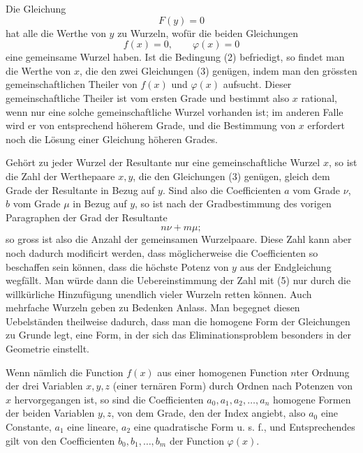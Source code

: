 \documentclass[11pt]{article}
\begin{document}
Die Gleichung
\begin{equation}
F(y)=0
\tag{2}
\end{equation}
hat alle die Werthe von $y$ zu Wurzeln, wofür die beiden Gleichungen
\begin{equation}
f(x)=0,\qquad \varphi(x)=0
\tag{3}
\end{equation}
eine gemeinsame Wurzel haben. Ist die Bedingung (2) befriedigt, so findet man die Werthe von $x$, die den zwei Gleichungen (3) genügen, indem man den grössten gemeinschaftlichen Theiler von $f(x)$ und $\varphi(x)$ aufsucht. Dieser gemeinschaftliche Theiler ist vom ersten Grade und bestimmt also $x$ rational, wenn nur eine solche gemeinschaftliche Wurzel vorhanden ist; im anderen Falle wird er von entsprechend höherem Grade, und die Bestimmung von $x$ erfordert noch die Lösung einer Gleichung höheren Grades.

Gehört zu jeder Wurzel der Resultante nur eine gemeinschaftliche Wurzel $x$, so ist die Zahl der Werthepaare $x,y$, die den Gleichungen (3) genügen, gleich dem Grade der Resultante in Bezug auf $y$. Sind also die Coefficienten $a$ vom Grade $\nu$, $b$ vom Grade $\mu$ in Bezug auf $y$, so ist nach der Gradbestimmung des vorigen Paragraphen der Grad der Resultante
\begin{equation}
n\nu+m\mu;
\tag{5}
\end{equation}
so gross ist also die Anzahl der gemeinsamen Wurzelpaare. Diese Zahl kann aber noch dadurch modificirt werden, dass möglicherweise die Coefficienten so beschaffen sein können, dass die höchste Potenz von $y$ aus der Endgleichung wegfällt. Man würde dann die Uebereinstimmung der Zahl mit (5) nur durch die willkürliche Hinzufügung unendlich vieler Wurzeln retten können. Auch mehrfache Wurzeln geben zu Bedenken Anlass. Man begegnet diesen Uebelständen theilweise dadurch, dass man die homogene Form der Gleichungen zu Grunde legt, eine Form, in der sich das Eliminationsproblem besonders in der Geometrie einstellt.

Wenn nämlich die Function $f(x)$ aus einer homogenen Function $n$ter Ordnung der drei Variablen $x,y,z$ (einer ternären Form) durch Ordnen nach Potenzen von $x$ hervorgegangen ist, so sind die Coefficienten $a_0,a_1,a_2,\ldots,a_n$ homogene Formen der beiden Variablen $y,z$, von dem Grade, den der Index angiebt, also $a_0$ eine Constante, $a_1$ eine lineare, $a_2$ eine quadratische Form u. s. f., und Entsprechendes gilt von den Coefficienten $b_0,b_1,\ldots,b_m$ der Function $\varphi(x)$.
\end{document}
